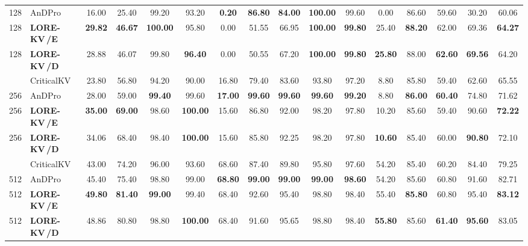 \documentclass{article} %
\newcommand{\best}[1]{\textcolor{bestblue}{\textbf{#1}}}
\newcommand{\second}[1]{\textcolor{secondorange}{#1}}
\newcommand{\lorekvE}{LORE-KV\,/E}
\newcommand{\lorekvD}{LORE-KV\,/D}
\begin{document}
\begin{table}[p]
{\begin{tabular}{llcccccccccccccc}
128 & AnDPro & 16.00 & 25.40 & 99.20 & 93.20 & \best{0.20} & \best{86.80} & \best{84.00} & \best{100.00} & \second{99.60} & 0.00 & 86.60 & 59.60 & 30.20 & 60.06 \\
128 & \textbf{\lorekvE} & \best{29.82} & \best{46.67} & \best{100.00} & \second{95.80} & \second{0.00} & 51.55 & 66.95 & \best{100.00} & \best{99.80} & \second{25.40} & \best{88.20} & \second{62.00} & \second{69.36} & \best{64.27} \\
128 & \textbf{\lorekvD} & \second{28.88} & \second{46.07} & \second{99.80} & \best{96.40} & \second{0.00} & 50.55 & \second{67.20} & \best{100.00} & \best{99.80} & \best{25.80} & \second{88.00} & \best{62.60} & \best{69.56} & \second{64.20} \\
\addlinespace[2pt]
256 & CriticalKV & 23.80 & 56.80 & 94.20 & 90.00 & \second{16.80} & 79.40 & 83.60 & 93.80 & 97.20 & 8.80 & \second{85.80} & 59.40 & 62.60 & 65.55 \\
256 & AnDPro & 28.00 & 59.00 & \best{99.40} & \second{99.60} & \best{17.00} & \best{99.60} & \best{99.60} & \best{99.60} & \best{99.20} & 8.80 & \best{86.00} & \best{60.40} & 74.80 & 71.62 \\
256 & \textbf{\lorekvE} & \best{35.00} & \best{69.00} & \second{98.60} & \best{100.00} & 15.60 & \second{86.80} & 92.00 & \second{98.20} & \second{97.80} & \second{10.20} & 85.60 & 59.40 & \second{90.60} & \best{72.22} \\
256 & \textbf{\lorekvD} & \second{34.06} & \second{68.40} & 98.40 & \best{100.00} & 15.60 & 85.80 & \second{92.25} & \second{98.20} & \second{97.80} & \best{10.60} & 85.40 & \second{60.00} & \best{90.80} & \second{72.10} \\
\addlinespace[2pt]
512 & CriticalKV & 43.00 & 74.20 & 96.00 & 93.60 & \second{68.60} & 87.40 & 89.80 & 95.80 & 97.60 & 54.20 & 85.40 & 60.20 & 84.40 & 79.25 \\
512 & AnDPro & 45.40 & 75.40 & \second{98.80} & 99.00 & \best{68.80} & \best{99.00} & \best{99.00} & \best{99.00} & \best{98.60} & 54.20 & \second{85.60} & \second{60.80} & 91.60 & 82.71 \\
512 & \textbf{\lorekvE} & \best{49.80} & \best{81.40} & \best{99.00} & \second{99.40} & 68.40 & \second{92.60} & 95.40 & \second{98.80} & \second{98.40} & \second{55.40} & \best{85.80} & \second{60.80} & \second{95.40} & \best{83.12} \\
512 & \textbf{\lorekvD} & \second{48.86} & \second{80.80} & \second{98.80} & \best{100.00} & 68.40 & 91.60 & \second{95.65} & \second{98.80} & \second{98.40} & \best{55.80} & \second{85.60} & \best{61.40} & \best{95.60} & \second{83.05} \\

\end{tabular}}
\end{table}
\end{document}
